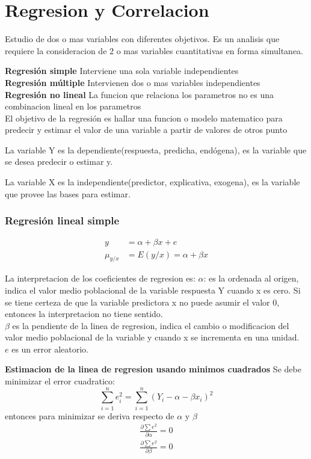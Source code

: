 \documentclass[10pt,a4paper]{article}
\begin{document}
\section{Regresion y Correlacion}
Estudio de dos o mas variables con diferentes objetivos. Es un analisis que requiere la consideracion de 2 o mas variables cuantitativas en forma simultanea.

\textbf{Regresión simple} Interviene una sola variable independientes\\

\textbf{Regresión múltiple} Intervienen dos o mas variables independientes\\

\textbf{Regresión no lineal} La funcion que relaciona los parametros no es una combinacion lineal en los parametros\\

El objetivo de la regresión es hallar una funcion o modelo matematico para predecir y estimar el valor de una variable a partir de valores de otros punto

La variable Y es la dependiente(respuesta, predicha, endógena), es la variable que se desea predecir o estimar y.

La variable X es la independiente(predictor, explicativa, exogena), es la variable que provee las bases para estimar.
\subsubsection{Regresión lineal simple}
\begin{align}
	y&=\alpha+\beta x+e\\
	\mu_{y/x}&=E(y/x)=\alpha+\beta x
\end{align}

La interpretacion de los coeficientes de regresion es:
$\alpha$: es la ordenada al origen, indica el valor medio poblacional de la variable respuesta Y cuando x es cero. Si se tiene certeza de que la variable predictora x no puede asumir el valor 0, entonces la interpretacion no tiene sentido.\\

$\beta$ es la pendiente de la linea de regresion, indica el cambio o modificacion del valor medio poblacional de la variable y cuando x se incrementa en una unidad.\\

$e$ es un error aleatorio.

\textbf{Estimacion de la linea de regresion usando minimos cuadrados}
Se debe minimizar el error cuadratico:
\begin{equation}
	\sum_{i=1}^{n}e_i^2=\sum_{i=1}^n(Y_i-\alpha-\beta x_i)^2
\end{equation}
entonces para minimizar se deriva respecto de $\alpha$ y $\beta$
\begin{align}
	\frac{\partial{\sum e^2}}{\partial{\alpha}}=0\\
	\frac{\partial{\sum e^2}}{\partial{\beta}}=0
\end{align}
\end{document}
